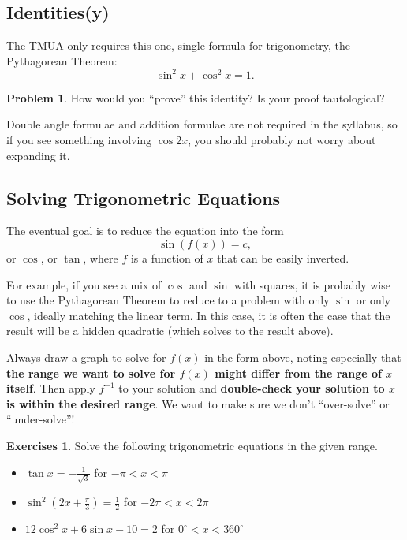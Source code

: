 \documentclass[11pt]{article}
\theoremstyle{definition}
\newtheorem{examples}[theorem]{Exercises}
\newtheorem{problem}[theorem]{Problem}
\theoremstyle{remark}
\newcommand{\pqty}[1]{\left(#1\right)}
\newcommand{\flatfrac}[2]{\frac{#1}{#2}}
\newcommand{\degree}{^{\circ}}
\newcommand{\inverse}{^{-1}}
\begin{document}
\subsection{Identities(y)}\label{tmua-2-subsection-007}

The TMUA only requires this one, single formula for trigonometry, the Pythagorean Theorem:
\[
    \sin^2 x + \cos^2 x = 1.
\]

\begin{problem}\label{tmua-2-unit-019}
    How would you ``prove'' this identity? Is your proof tautological?
\end{problem}

Double angle formulae and addition formulae are not required in the syllabus, so if you see something involving \(\cos 2x\), you should probably not worry about expanding it.

\subsection{Solving Trigonometric Equations}\label{tmua-2-subsection-008}

The eventual goal is to reduce the equation into the form
\[
    \sin \pqty{f\pqty{x}} = c,
\]
or \(\cos\), or \(\tan\), where \(f\) is a function of \(x\) that can be easily inverted.

For example, if you see a mix of \(\cos\) and \(\sin\) with squares, it is probably wise to use the Pythagorean Theorem to reduce to a problem with only \(\sin\) or only \(\cos\), ideally matching the linear term. In this case, it is often the case that the result will be a hidden quadratic (which solves to the result above).

Always draw a graph to solve for \(f\pqty{x}\) in the form above, noting especially that \textbf{the range we want to solve for \(f\pqty{x}\) might differ from the range of \(x\) itself}. Then apply \(f\inverse\) to your solution and \textbf{double-check your solution to \(x\) is within the desired range}. We want to make sure we don't ``over-solve'' or ``under-solve''!

\begin{examples}\label{tmua-2-unit-020}
    Solve the following trigonometric equations in the given range.
    \begin{itemize}
        \item \(\tan x = - \flatfrac{1}{\sqrt{3}}\) for \(-\pi < x < \pi\)
        \item \(\sin^2 \pqty{2x + \flatfrac{\pi}{3}} = \flatfrac{1}{2}\) for \(-2 \pi < x < 2\pi\)
        \item \(12 \cos^2 x + 6 \sin x - 10 = 2\) for \(0\degree < x < 360\degree\)
    \end{itemize}
\end{examples}
\end{document}
